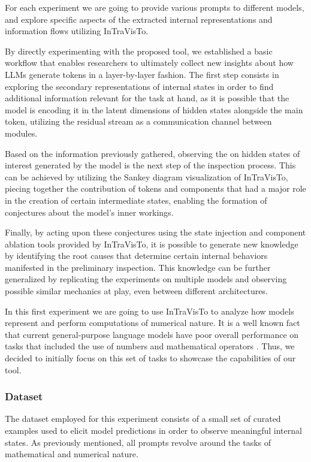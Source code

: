 For each experiment we are going to provide various prompts to different models, and explore specific aspects of the extracted internal representations and information flows utilizing InTraVisTo.

By directly experimenting with the proposed tool, we established a basic workflow that enables researchers to ultimately collect new insights about how LLMs generate tokens in a layer-by-layer fashion.
The first step consists in exploring the secondary representations of internal states in order to find additional information relevant for the task at hand, as it is possible that the model is encoding it in the latent dimensions of hidden states alongside the main token, utilizing the residual stream as a communication channel between modules.

Based on the information previously gathered, observing the  on hidden states of interest generated by the model is the next step of the inspection process.
This can be achieved by utilizing the Sankey diagram visualization of InTraVisTo, piecing together the contribution of tokens and components that had a major role in the creation of certain intermediate states, enabling the formation of conjectures about the model's inner workings.

Finally, by acting upon these conjectures using the state injection and component ablation tools provided by InTraVisTo, it is possible to generate new knowledge by identifying the root causes that determine certain internal behaviors manifested in the preliminary inspection.
This knowledge can be further generalized by replicating the experiments on multiple models and observing possible similar mechanics at play, even between different architectures.

In this first experiment we are going to use InTraVisTo to analyze how models represent and perform computations of numerical nature.
It is a well known fact that current general-purpose language models have  poor overall performance on tasks that included the use of numbers and mathematical operators .
Thus, we decided to initially focus on this set of tasks to showcase the  capabilities of our  tool.

\subsubsection{Dataset}

The dataset employed for this experiment consists of a small set of curated examples used to elicit model predictions in order to observe meaningful internal states.
As previously mentioned, all prompts revolve around the  tasks of mathematical and numerical nature.

